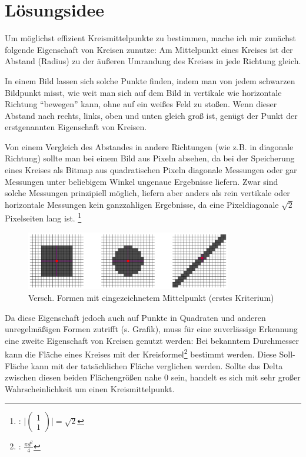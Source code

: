 \section{Lösungsidee}
Um möglichst effizient Kreismittelpunkte zu bestimmen, mache ich mir zunächst folgende Eigenschaft von Kreisen zunutze: Am Mittelpunkt eines Kreises ist der Abstand (Radius) zu der äußeren Umrandung des Kreises in jede Richtung gleich.

In einem Bild lassen sich solche Punkte finden, indem man von jedem schwarzen Bildpunkt misst, wie weit man sich auf dem Bild in vertikale wie horizontale Richtung "`bewegen"' kann, ohne auf ein weißes Feld zu stoßen. Wenn dieser Abstand nach rechts, links, oben und unten gleich groß ist, genügt der Punkt der erstgenannten Eigenschaft von Kreisen. 

Von einem Vergleich des Abstandes in andere Richtungen (wie z.B. in diagonale Richtung) sollte man bei einem Bild aus Pixeln absehen, da bei der Speicherung eines Kreises als Bitmap aus quadratischen Pixeln diagonale Messungen oder gar Messungen unter beliebigem Winkel ungenaue Ergebnisse liefern. Zwar sind solche Messungen prinzipiell möglich, liefern aber anders als rein vertikale oder horizontale Messungen kein ganzzahligen Ergebnisse, da eine Pixeldiagonale \(\sqrt{2}\) Pixelseiten lang ist.
\footnote{: \( \vert \begin{pmatrix}1\\1\end{pmatrix} \vert = \sqrt{2}\)}

\begin{figure}[!ht]
	\centering	
	\includegraphics[width=0.8\textwidth]{durchmesservergleich}
	\caption{Versch. Formen mit eingezeichnetem Mittelpunkt (erstes Kriterium)}
\end{figure}

Da diese Eigenschaft jedoch auch auf Punkte in Quadraten und anderen unregelmäßigen Formen zutrifft (s. Grafik), muss für eine zuverlässige Erkennung eine zweite Eigenschaft von Kreisen genutzt werden: Bei bekanntem Durchmesser kann die Fläche eines Kreises mit der Kreisformel\footnote{: \(\frac{\pi d^2}{4}\)} bestimmt werden. Diese Soll-Fläche kann mit der tatsächlichen Fläche verglichen werden. Sollte das Delta zwischen diesen beiden Flächengrößen nahe 0 sein, handelt es sich mit sehr großer Wahrscheinlichkeit um einen Kreismittelpunkt.

